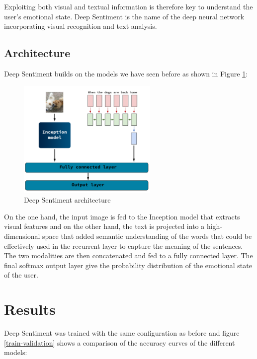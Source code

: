 \documentclass{article} %
\begin{document}
Exploiting both visual and textual information is therefore key to understand the user's emotional state. Deep Sentiment is the name of the deep neural network incorporating visual recognition and text analysis.

\subsection{Architecture}
Deep Sentiment builds on the models we have seen before as shown in Figure \ref{deep-sentiment}:

\begin{figure}[H]
    \centering
    \includegraphics[width=0.6\textwidth]{Images/deep-sentiment.png}
    \caption{Deep Sentiment architecture}
    \label{deep-sentiment}
\end{figure}

On the one hand, the input image is fed to the Inception model that extracts visual features and on the other hand, the text is projected into a high-dimensional space that added semantic understanding of the words that could be effectively used in the recurrent layer to capture the meaning of the sentences.
The two modalities are then concatenated and fed to a fully connected layer. The final softmax output layer give the probability distribution of the emotional state of the user.

\section{Results}
Deep Sentiment was trained with the same configuration as before and figure \ref{train-validation} shows a comparison of the accuracy curves of the different models:
\end{document}
